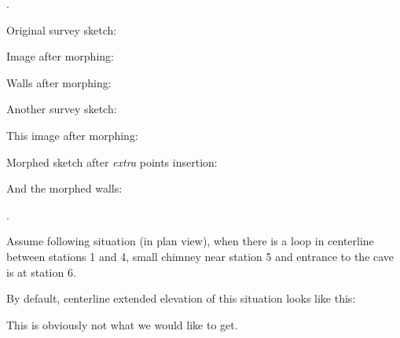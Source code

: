 

.


 Original survey sketch:







 Image after morphing:







 Walls after morphing:







 Another survey sketch:







 This image after morphing:







 Morphed sketch after {\it extra} points insertion:







 And the morphed walls:






.


 Assume following situation (in plan view),
 when there is a loop in centerline between stations 1 and 4, 
 small chimney near station 5
 and entrance to the cave is at station 6.







 By default, centerline extended elevation of this situation looks like this:







 This is obviously not what we would like to get.




